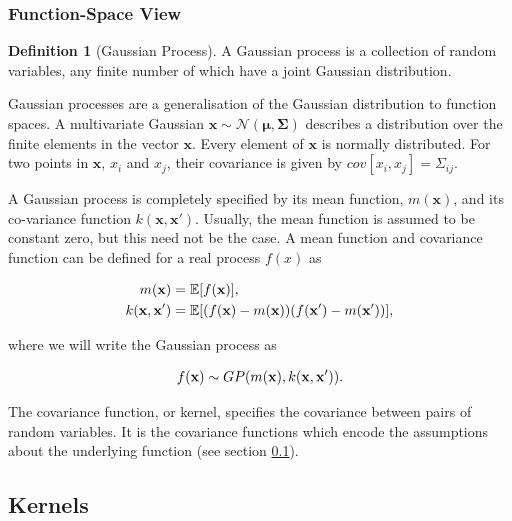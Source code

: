 \documentclass[12pt,a4paper]{report}
\theoremstyle{definition}
\newtheorem{definition}{Definition}[section]
\begin{document}
\subsubsection{Function-Space View}

\begin{definition}[Gaussian Process]
A Gaussian process is a collection of random variables, any finite number of which have a joint Gaussian distribution. 
\end{definition}

Gaussian processes are a generalisation of the Gaussian distribution to function spaces. 
A multivariate Gaussian $\textbf{x} \sim \mathcal{N} (\boldsymbol{\mu}, \boldsymbol{\Sigma})$ describes a distribution over the finite elements in the vector $\textbf{x}$. 
Every element of $\textbf{x}$ is normally distributed. 
For two points in $\textbf{x}$, $x_{i}$ and $x_{j}$, their covariance is given by $cov[x_{i}, x_{j}] = \Sigma_{ij}$.

A Gaussian process is completely specified by its mean function, $m(\textbf{x})$, and its co-variance function $k(\textbf{x}, \textbf{x}')$.
Usually, the mean function is assumed to be constant zero, but this need not be the case.
A mean function and covariance function can be defined for a real process $f(x)$ as 

\begin{equation}
	\begin{aligned}
		\centering
		m(\textbf{x}) &= \mathbb{E}[f(\textbf{x})],\\
		k(\textbf{x}, \textbf{x}') &= \mathbb{E}[(f(\textbf{x}) - m(\textbf{x}))(f(\textbf{x}') - m(\textbf{x}'))],
	\end{aligned}
\end{equation}

where we will write the Gaussian process as 

\begin{equation}
	\centering
	f(\textbf{x}) \sim GP(m(\textbf{x}), k(\textbf{x}, \textbf{x}')).
\end{equation}

The covariance function, or kernel, specifies the covariance between pairs of random variables. It is the covariance functions which encode the assumptions about the underlying function (see section \ref{sec:Kernels}).

\subsection{Kernels} \label{sec:Kernels}
\end{document}
